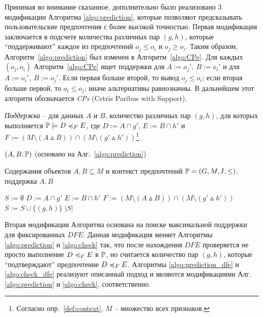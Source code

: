 	Принимая во внимание сказанное, дополнительно было реализовано 3 модификации Алгоритма \ref{algo:prediction}, которые позволяют предсказывать пользовательские предпочтения с более высокой точностью.
	Первая модификация заключается в подсчете количества различных пар $(g,h)$, которые ``поддерживают'' каждое из предпочтений $o_j \leq o_i$ и $o_j \geq o_i$. Таким образом, Алгоритм~\ref{algo:prediction} был изменен в Алгоритм~\ref{algo:CPe}. Для каждых $(o_j, o_i)$ Алгоритм~\ref{algo:CPe} ищет поддержки для $A:=o_j',\: B:=o_i'$ и для $A:=o_i',\: B:=o_j'$. Если первая больше второй, то вывод $o_j \leq o_i$; если вторая больше первой, то $o_i \leq o_j$; иначе альтернативы равнозначны. В дальнейшем этот алгоритм обозначается \emph{CPs} (Cetris Paribus with Support).
	
	\begin{definition}
		\emph{Поддержка} – для данных $A$ и $B$, количество различных пар $(g, h)$, для которых выполняется $\PP \models \DEF$, где $D := A \cap g'$, $E := B \cap h'$ и $F := (M \setminus (A \vartriangle B)) \cap (M \setminus (g' \vartriangle h'))$\footnote{Согласно опр.~\ref{def:context}, $M$ – множество всех признаков.}.
	\end{definition}
	
	\begin{algorithm}
		\caption{$(A, B, \mathbb{P})$ (основано на Алг.~\ref{algo:prediction})}
		\label{algo:CPe}
		\begin{algorithmic}[1]
			\REQUIRE Содержания объектов $A, B \subseteq M$ и контекст предпочтений $\mathbb{P} = (G, M, I, \leq)$.
			\ENSURE поддержка $A, B$
			\item[]
			\STATE $S := \emptyset$
			\STATE $D := A \cap g'$
			\STATE $E := B \cap h'$
			\STATE $F := (M \setminus (A \vartriangle B)) \cap (M \setminus (g' \vartriangle h'))$
			\IF{$\PP \models \DEF$}
			\STATE $S := S \cup \{(g, h)\}$
			\ENDIF
			\ENDFOR
			\ENDFOR
			\RETURN $|S|$
		\end{algorithmic}
	\end{algorithm}
	
	Вторая модификация Алгоритма основана на поиске максимальной поддержки для фиксированных $DFE$. Данная модификация меняет Алгоритмы \ref{algo:prediction} и \ref{algo:check} так, что после нахождения $DFE$ проверяется не просто выполнение  $D \preccurlyeq_{F} E$ в $\mathbb{P}$, но считается количество пар $(g,h)$, которые ``подтверждают'' предпочтение $D \preccurlyeq_{F} E$. Алгоритмы \ref{algo:prediction_dfe} и \ref{algo:check_dfe} реализуют описанный подход и являются модификациями Алг. \ref{algo:prediction} и \ref{algo:check}, соответственно.
	
